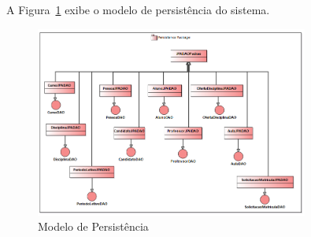 A Figura~\ref{modelo-persistencia-10} exibe o modelo de persistência do sistema.

\begin{figure}[h]
	\centering
	\includegraphics[width=0.8\textwidth]{figuras/modelo-persistencia-10.png}
	\caption{Modelo de Persistência}
	\label{modelo-persistencia-10}
\end{figure}


